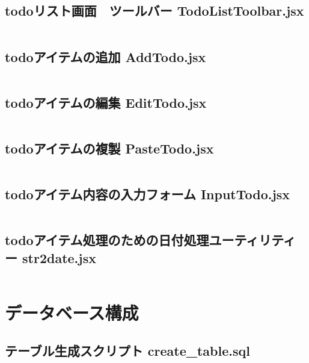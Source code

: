 \documentclass[paper=a4paper, fontsize=10pt, head_space=10mm, foot_space=17mm, gutter=17mm, line_length=185mm, twoside]{jlreq}
\begin{document}
\subsection {todoリスト画面　ツールバー TodoListToolbar.jsx} 
\inputminted[linenos, breaklines]{jsx}{src-react/TodoListToolbar.jsx}
\clearpage

\subsection {todoアイテムの追加 AddTodo.jsx}
\inputminted[linenos, breaklines]{jsx}{src-react/AddTodo.jsx}
\clearpage

\subsection {todoアイテムの編集 EditTodo.jsx}
\inputminted[linenos, breaklines]{jsx}{src-react/EditTodo.jsx}
\clearpage

\subsection {todoアイテムの複製 PasteTodo.jsx}
\inputminted[linenos, breaklines]{jsx}{src-react/PasteTodo.jsx}
\clearpage

\subsection {todoアイテム内容の入力フォーム InputTodo.jsx}
\inputminted[linenos, breaklines]{jsx}{src-react/InputTodo.jsx}
\clearpage

\subsection {todoアイテム処理のための日付処理ユーティリティー str2date.jsx}
\inputminted[linenos, breaklines]{jsx}{src-react/str2date.jsx}
\clearpage

\section{データベース構成}
\subsection{テーブル生成スクリプト create\_table.sql}
\inputminted[linenos, breaklines]{sql}{mariadb/create_table.sql}
\clearpage
\end{document}
